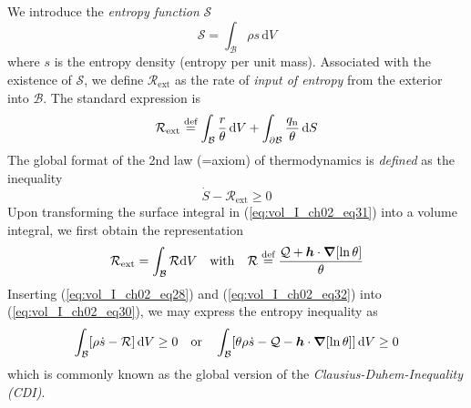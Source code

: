 We introduce the {\em entropy function}
$\mathcal{S}$
\begin{equation}
  {\mathcal S}=\int_{\mathcal B}\rho s\,{\mathrm{d}}V
     \label{eq:vol_I_ch02_eq28}
\end{equation}
where $s$ is the entropy density (entropy per unit mass). Associated with the existence of ${\mathcal S}$, we define ${\mathcal
R}_{\mathrm{ext}}$ as the rate of {\em input of entropy} from the
exterior into $\mathcal B$. The standard expression is
\begin{equation}
  {\mathcal R}_{\mathrm{ext}} \stackrel{\text{def}}{=}
  \int_{\mathcal{B}}\frac{r}{\theta}\,{\mathrm{d}}V +
  \int_{\partial \mathcal{B}}\frac{q_{\mathrm{n}}}{\theta}\,{\mathrm{d}}S
     \label{eq:vol_I_ch02_eq31}
\end{equation}
The global format of the 2nd law (=axiom) of thermodynamics is {\em defined} as the inequality
\begin{equation}
  \dot{S} - {\mathcal R}_{\mathrm{ext}} \geq 0
     \label{eq:vol_I_ch02_eq30}
\end{equation}
Upon transforming the surface integral in (\ref{eq:vol_I_ch02_eq31})
into a  volume integral, we first obtain the representation
\begin{equation}
  {\mathcal R}_{\mathrm{ext}} = \int_{\mathcal{B}} {\mathcal R} \mathrm{d}V \quad \mathrm{with} \quad
  {\mathcal R} \stackrel{\text{def}}{=}
  \frac{\mathcal{Q}+{\bm h}\cdot\bm{\nabla}[\ln\theta]}{\theta}
 \label{eq:vol_I_ch02_eq32}
\end{equation}
Inserting (\ref{eq:vol_I_ch02_eq28}) and (\ref{eq:vol_I_ch02_eq32})
into (\ref{eq:vol_I_ch02_eq30}), we may express the entropy inequality as
\begin{equation}
 \label{eq:vol_I_ch02_eq33}
  \int_{\mathcal{B}} [\rho \dot{s} - {\mathcal R}] \mathop{}\!\mathrm{d} V \geq 0 \quad\mbox{or}\quad
  \int_{\mathcal{B}} [\theta\rho \dot{s} - \mathcal{Q} - {\bm h}\cdot\bm{\nabla}[\ln\theta]] \mathop{}\!\mathrm{d} V \geq 0
\end{equation}
which is commonly known as the global version of the {\em Clausius-Duhem-Inequality (CDI)}.

